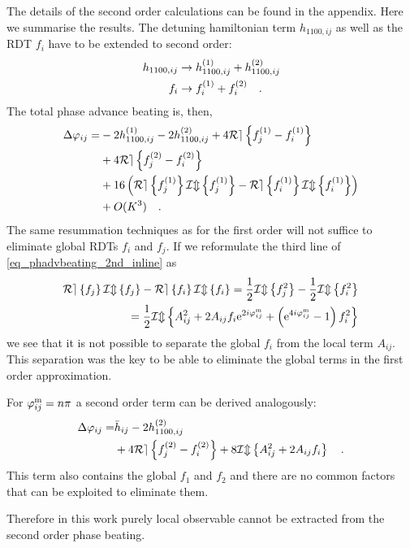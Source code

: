 The details of the second order calculations can be found in the appendix. Here we summarise the results.
The detuning hamiltonian term $h_{1100,ij} $ as well as the RDT $f_{i} $ have to be extended to second order:
%
\begin{align}
  h_{1100,ij} &\rightarrow h_{1100,ij}^{(1)} + h_{1100,ij}^{(2)}\\
  f_{i} &\rightarrow f_{i}^{(1)} + f_{i}^{(2)}
  \quad .
  \label{eq_1st--2nd}
\end{align}
%
The total phase advance beating is, then,
%
\begin{align}
  \Delta\varphi_{ij} = &-2h_{1100,ij}^{(1)} 
  - 2h^{(2)}_{1100,ij}
  + 4\mathcal{Re} \left\{ f_j^{(1)} - f_i^{(1)} \right\} \notag\\
  &+ 4\mathcal{Re} \left\{ f_j^{(2)} - f_i^{(2)} \right\}\notag \\
  &+ 16 \left( \mathcal{Re} \left\{ f_j^{(1)} \right\} \mathcal{Im} \left\{ f_j^{(1)} \right\} - \mathcal{Re} \left\{ f_i^{(1)} \right\} \mathcal{Im} \left\{ f_i^{(1)} \right\} \right)\notag\\
  &+ O(K^{3})
  \quad .
  \label{eq_phadvbeating_2nd_inline}
\end{align}
%
The same resummation techniques as for the first order will not suffice to eliminate
global RDTs $f_i$ and $f_j$.
If we reformulate the third line of \eqref{eq_phadvbeating_2nd_inline} as
%
\begin{align}
   \mathcal{Re} \left\{ f_j \right\} \mathcal{Im} \left\{ f_j \right\} - \mathcal{Re} \left\{ f_i \right\} \mathcal{Im} \left\{ f_i \right\}  = 
   \frac{1}{2}\mathcal{Im} \left\{ f_j^2 \right\} - \frac{1}{2}\mathcal{Im} \left\{ f_i^2 \right\} \notag \\
    = \frac{1}{2} \mathcal{Im} \left\{  
     A_{ij}^2 + 2A_{ij}f_i\text{e}^{2i\varphi_{ij}^\text{m}} + 
     \left( \text{e}^{4i\varphi_{ij}^\text{m}} - 1 \right) f_{i}^2 \right\}
  \label{eq_expanding2ndorder}
\end{align}
%
we see that it is not possible to separate the global $f_i$ from the local term $A_{ij}$. This
separation was the key to be able to eliminate the global terms in the first order approximation.

For $\varphi_{ij}^\text{m} = n\pi$ a second order term can be derived analogously:
%
\begin{align}
  \Delta\varphi_{ij} = & \bar{h}_{ij} - 2h_{1100,ij}^{(2)} \notag \\
  &+ 4\mathcal{Re} \left\{ f_j^{(2)}-f_i^{(2)} \right\} + 8\mathcal{Im} \left\{ A_{ij}^{2}+ 2A_{ij}f_i \right\}
  \quad .
  \label{eq_npi_second}
\end{align}
%
This term also contains the global $f_1$ and $f_2$ and there are no common factors that can be exploited
to eliminate them.

Therefore in this work purely local observable cannot be extracted from the second order phase beating.

